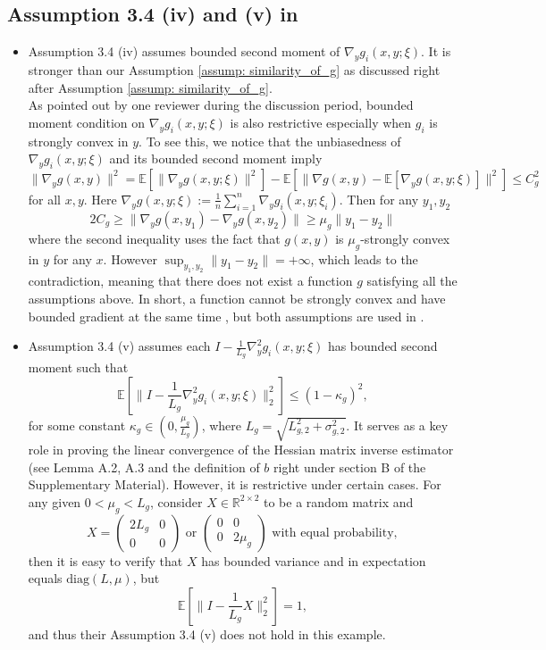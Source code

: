 \documentclass{article}
\theoremstyle{plain}
\theoremstyle{definition}
\theoremstyle{remark}
\newcommand{\R}{\mathbb{R}}
\newcommand{\E}{\mathbb{E}}
\begin{document}
\subsection{Assumption 3.4 (iv) and (v) in \citet{yang2022decentralized}}
\begin{itemize}
    \item Assumption 3.4 (iv) assumes bounded second moment of $\nabla_yg_i(x,y;\xi)$. It is stronger than our Assumption \ref{assump: similarity_of_g} as discussed right after Assumption \ref{assump: similarity_of_g}. \\
    As pointed out by one reviewer during the discussion period, bounded moment condition on $\nabla_y g_i(x,y;\xi)$ is also restrictive especially when $g_i$ is strongly convex in $y$. To see this, we notice that the unbiasedness of $\nabla_y g_i(x,y;\xi)$ and its bounded second moment imply
\[
    \|\nabla_y g(x,y)\|^2 = \E\left[\|\nabla_y g(x,y;\xi)\|^2\right] -  \E\left[\|\nabla g(x,y) - \E\left[\nabla_y g(x,y;\xi)\right]\|^2\right]\leq C_g^2
\]
for all $x, y$. Here $\nabla_y g(x,y;\xi):=\frac{1}{n}\sum_{i=1}^{n}\nabla_y g_i(x,y;\xi_i)$. Then for any $y_1, y_2$
    \[
        2C_g\geq \|\nabla_y g(x, y_1) - \nabla_y g(x, y_2)\| \geq \mu_g \|y_1 - y_2\|
    \]
where the second inequality uses the fact that $g(x,y)$ is $\mu_g$-strongly convex in $y$ for any $x$. However $\sup_{y_1, y_2}\|y_1 - y_2\|=+\infty$, which leads to the contradiction, meaning that there does not exist a function $g$ satisfying all the assumptions above. In short, a function cannot be strongly convex and have bounded gradient at the same time , but both assumptions are used in \citet{yang2022decentralized}.
    
    \item Assumption 3.4 (v) assumes each $I - \frac{1}{L_g}\nabla_y^2g_i(x,y;\xi)$ has bounded second moment such that
\[
    \E\left[\|I - \frac{1}{L_g}\nabla_y^2g_i(x,y;\xi)\|_2^2\right]\leq (1-\kappa_g)^2,
\]
for some constant $\kappa_g\in (0, \frac{\mu_g}{L_g})$, where $L_g = \sqrt{L_{g,2}^2 + \sigma_{g,2}^2}$. It serves as a key role in proving the linear convergence of the Hessian matrix inverse estimator (see Lemma A.2, A.3 and the definition of $b$ right under section B of the Supplementary Material). However, it is restrictive under certain cases. For any given $0<\mu_g<L_g$, consider $X\in\R^{2\times 2}$ to be a random matrix and
    \[
        X = 
        \begin{pmatrix}
            2L_g &0 \\
            0 &0 
        \end{pmatrix} \text{ or }
        \begin{pmatrix}
            0 &0 \\
            0 &2\mu_g 
        \end{pmatrix} \text{ with equal probability},
    \]
    then it is easy to verify that $X$ has bounded variance and in expectation equals $\text{diag}(L, \mu)$, but
    \[
        \E\left[\|I - \frac{1}{L_g}X\|_2^2\right]=1,
    \]
    and thus their Assumption 3.4 (v) does not hold in this example. 
\end{itemize}
\end{document}
